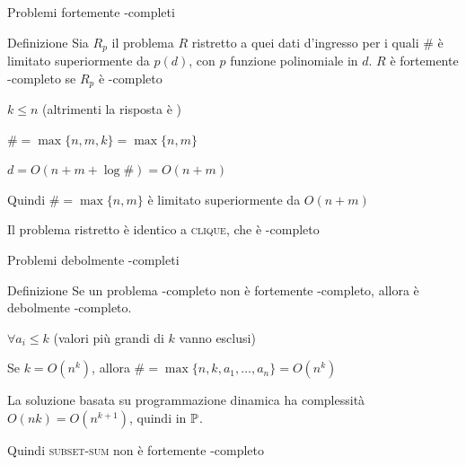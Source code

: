 \begin{frame}{Problemi fortemente \NP-completi}

\vspace{-9pt}
\begin{block}{Definizione}
Sia $R_p$ il problema $R$ ristretto a quei dati d'ingresso per i quali \# è
limitato superiormente da $p(d)$, con $p$ funzione polinomiale in $d$. $R$ è
\alert{fortemente \NP-completo} se $R_p$ è \NP-completo
\end{block}

\bigskip
{}
\BIL
\item $k \leq n$ (altrimenti la risposta è \FALSE)
\item $\# = \max \{ n, m, k \} = \max \{ n, m \}$
\item $d = O(n + m + \log \#) = O(n+m)$
\item Quindi $\# = \max \{ n, m \}$ è limitato superiormente da $O(n+m)$
\item Il problema ristretto è identico a \textsc{clique}, che è \NP-completo
\EIL

\end{frame}

\begin{frame}{Problemi debolmente \NP-completi}

\vspace{-9pt}
\begin{block}{Definizione}
Se un problema \NP-completo non è fortemente \NP-completo, allora è \alert{debolmente \NP-completo}.    
\end{block}

\bigskip
{}
\BIL
\item $\forall a_i \leq k$ (valori più grandi di $k$ vanno esclusi)
\item Se $k=O(n^k)$, allora $\# = \max \{n, k, a_1, \ldots, a_n\} = O(n^k)$
\item La soluzione basata su programmazione dinamica ha complessità
$O(nk) = O(n^{k+1})$, quindi in $\mbox{\sc $\mathbb{P}$}$.
\item Quindi \textsc{subset-sum} non è fortemente \NP-completo
\EIL

\end{frame}

